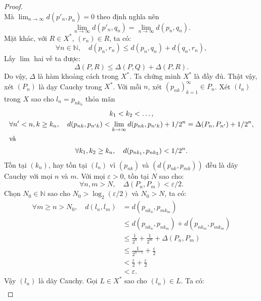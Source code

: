 \begin{proof}
\begin{equation}
  \end{equation}Mà $\lim_{n\to\infty}d(p'_n, p_n) = 0$ theo định nghĩa nên
  \begin{equation}
    \lim_{n\to\infty}d(p'_n, q_n) = \lim_{n\to\infty}d(p_n, q_n).
  \end{equation}Mặt khác, với $R \in X^\ast$, $(r_n) \in R$, ta có:
  \begin{equation}
    \forall n \in\mathbb{N}, \quad d(p_n, r_n) \le d(p_n, q_n) + d(q_n, r_n),
  \end{equation}Lấy $\lim$ hai vế ta được: \begin{equation}
    \Delta(P, R) \le \Delta(P, Q) + \Delta(P, R).
  \end{equation}Do vậy, $\Delta$ là hàm khoảng cách trong $X^\ast$. Ta chứng
  minh $X^\ast$ là đầy đủ. Thật vậy, xét $(P_n)$ là dạy Cauchy trong $X^\ast$.
  Với mỗi $n$, xét $(p_{nk})_{k=1}^\infty \in P_n$. Xét $(l_n)$ trong $X$ sao
  cho $l_n = p_{nk_n}$ thỏa mãn \begin{gather}
    k_1 < k_2 < \dotsc, \\
    \forall n' < n, k \ge k_n, \quad d(p_{nk}, p_{n'k}) < \lim_{k\to\infty}
    d(p_{nk}, p_{n'k}) + 1/2^n = \Delta(P_n, P_{n'}) + 1/2^n, \\
    \intertext{và}
    \forall k_1, k_2 \ge k_n, \quad d(p_{nk_1}, p_{nk_2}) < 1/2^n.
  \end{gather}Tồn tại $(k_n)$, hay tồn tại $(l_n)$ vì $(p_{nk})$ và $(d(p_{nk},
  p_{mk}))$ đều là dãy Cauchy với mọi $n$ và $m$. Với mọi $\varepsilon > 0$,
  tồn tại $N$ sao cho:
  \begin{equation}
    \forall n, m > N, \quad  \Delta(P_n, P_m) < \varepsilon/2.
  \end{equation} Chọn $N_0 \in\mathbb{N}$ sao cho $N_0 > \log_2(\varepsilon/2)$
  và $N_0 > N$, ta có: \begin{align}
      \forall m\ge n > N_0, \quad d(l_n, l_m) &= d(p_{nk_n}, p_{mk_m})\\
      &\le d(p_{nk_n}, p_{nk_m}) + d(p_{nk_m}, p_{mk_m}) \\
      &\le \frac{1}{2^n} + \frac{1}{2^m} + \Delta(P_n, P_{m})\\
      &\le \frac{1}{2^{n-1}} + \frac{\varepsilon}{2}\\
      &< \frac{\varepsilon}{2} + \frac{\varepsilon}{2}\\
      &< \varepsilon.
  \end{align}Vậy $(l_n)$ là dãy Cauchy. Gọi $L\in X^\ast$ sao cho $(l_n) \in
  L$. Ta có: \begin{align}

\end{align}
\end{proof}
